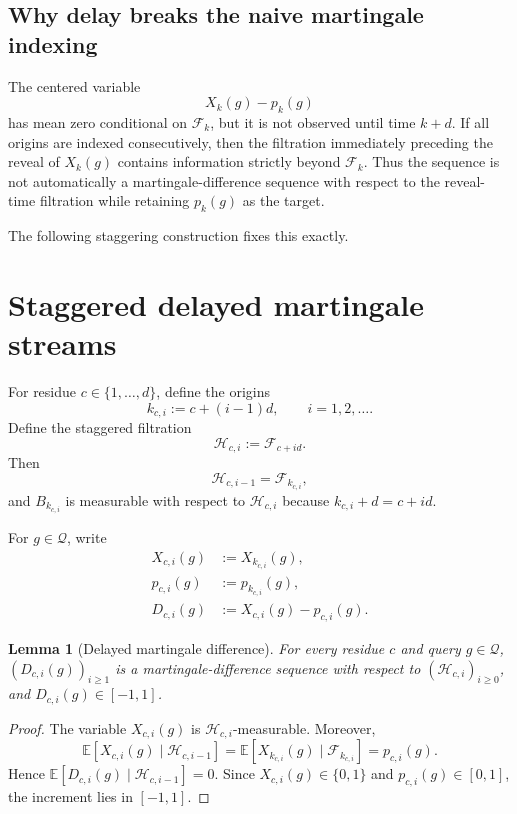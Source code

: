 \documentclass[11pt]{article}
\newtheorem{lemma}[theorem]{Lemma}
\newcommand{\E}{\mathbb{E}}
\newcommand{\F}{\mathcal{F}}
\newcommand{\Q}{\mathcal{Q}}
\newcommand{\1}{\mathbf{1}}
\begin{document}
\subsection{Why delay breaks the naive martingale indexing}

The centered variable
\[
    X_k(g)-p_k(g)
\]
has mean zero conditional on $\F_k$, but it is not observed until time $k+d$.
If all origins are indexed consecutively, then the filtration immediately
preceding the reveal of $X_k(g)$ contains information strictly beyond $\F_k$.
Thus the sequence is not automatically a martingale-difference sequence with
respect to the reveal-time filtration while retaining $p_k(g)$ as the target.

The following staggering construction fixes this exactly.

\section{Staggered delayed martingale streams}

For residue $c\in\{1,\ldots,d\}$, define the origins
\begin{equation}
    k_{c,i}
    :=
    c+(i-1)d,
    \qquad i=1,2,\ldots.
    \label{eq:origin-residue}
\end{equation}
Define the staggered filtration
\begin{equation}
    \mathcal H_{c,i}
    :=
    \F_{c+id}.
    \label{eq:staggered-filtration}
\end{equation}
Then
\[
    \mathcal H_{c,i-1}
    =
    \F_{k_{c,i}},
\]
and $B_{k_{c,i}}$ is measurable with respect to
$\mathcal H_{c,i}$ because
$k_{c,i}+d=c+id$.

For $g\in\Q$, write
\begin{align}
    X_{c,i}(g)
    &:= X_{k_{c,i}}(g),
    \\
    p_{c,i}(g)
    &:= p_{k_{c,i}}(g),
    \\
    D_{c,i}(g)
    &:= X_{c,i}(g)-p_{c,i}(g).
\end{align}

\begin{lemma}[Delayed martingale difference]
\label{lem:delayed-mds}
For every residue $c$ and query $g\in\Q$,
$(D_{c,i}(g))_{i\ge1}$ is a martingale-difference sequence with respect to
$(\mathcal H_{c,i})_{i\ge0}$, and $D_{c,i}(g)\in[-1,1]$.
\end{lemma}

\begin{proof}
The variable $X_{c,i}(g)$ is $\mathcal H_{c,i}$-measurable.  Moreover,
\[
    \E[X_{c,i}(g)\mid\mathcal H_{c,i-1}]
    =
    \E[X_{k_{c,i}}(g)\mid\F_{k_{c,i}}]
    =
    p_{c,i}(g).
\]
Hence
$\E[D_{c,i}(g)\mid\mathcal H_{c,i-1}]=0$.
Since $X_{c,i}(g)\in\{0,1\}$ and $p_{c,i}(g)\in[0,1]$, the increment lies in
$[-1,1]$.
\end{proof}
\end{document}
